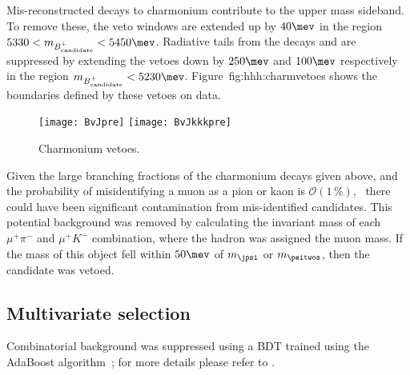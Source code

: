 Mis-reconstructed decays to charmonium contribute to the upper mass sideband.
To remove these, the veto windows are extended up by $40\mev$ in the region
$5330<m_{B^+_\mathrm{candidate}}<5450\mev$.
Radiative tails from the decays \decay{\jpsi}{\mumu\gamma} and \decay{\psitwos}{\mumu\gamma} are
suppressed by extending the vetoes down by $250\mev$ and $100\mev$ respectively in the region
$m_{B^+_\mathrm{candidate}}<5230\mev$.
Figure~{fig:hhh:charmvetoes} shows the boundaries defined by these vetoes on data.


\begin{figure}
  \begin{center}
    \texttt{[image: BvJpre]}
    \texttt{[image: BvJkkkpre]}
    \caption{\small
      Charmonium vetoes.
    }
    \label{fig:hhh:charmvetoes}
  \end{center}
\end{figure}

Given the large branching fractions of the charmonium decays given above, and the probability of
misidentifying a muon as a pion or kaon is $\mathcal{O}(1\,\%)$,~\cite{LHCb-DP-2013-001}
there could have been significant contamination from mis-identified candidates.
This potential background was removed by calculating the invariant mass of each $\mu^+\pi^-$ and
$\mu^+K^-$ combination, where the hadron was assigned the muon mass.
If the mass of this object fell within $50\mev$ of $m_\jpsi$ or $m_\psitwos$, then the candidate
was vetoed.







\subsection{Multivariate selection}
Combinatorial background was suppressed using a BDT trained using the AdaBoost
algorithm~\cite{AdaBoost}; for more details please refer to .









